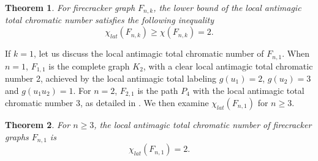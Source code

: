 \documentclass[12pt]{article}
\newtheorem{theorem}{Theorem}[section]
\begin{document}
\begin{theorem}\label{Theorem 2.3}
For firecracker graph $F_{n,k}$, the lower bound of the local antimagic total chromatic number satisfies the following inequality
\begin{equation*}
  \chi_{lat}(F_{n,k})\geq \chi(F_{n,k})=2.
\end{equation*}
\end{theorem}

If $k=1$, let us discuss the local antimagic total chromatic number of $F_{n,1}$. When $n=1$, $F_{1,1}$ is the complete graph $K_2$, with a clear local antimagic total chromatic number 2, achieved by the local antimagic total labeling $g(u_1)=2$, $g(u_2)=3$ and $g(u_{1}u_{2})=1$. For $n=2$, $F_{2,1}$ is the path $P_4$ with the local antimagic total chromatic number 3, as detailed in \cite[Theorem 3.4]{Lau-7}. We then examine $\chi_{lat}(F_{n,1})$ for $n\geq 3$.%
\begin{theorem}
For $n\geq 3$, the local antimagic total chromatic number of firecracker graphs $F_{n,1}$ is
\begin{equation*}
  \chi_{lat}(F_{n,1})=2.
\end{equation*}
\end{theorem}
\end{document}
